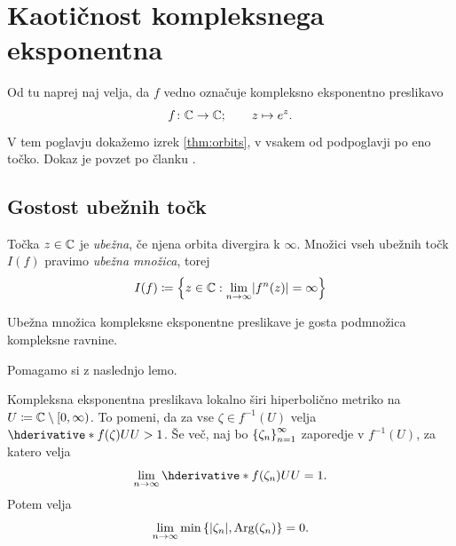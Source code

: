 \section{Kaotičnost kompleksnega eksponentna}

Od tu naprej naj velja, da \(f\) vedno označuje kompleksno eksponentno preslikavo
\[f \colon \mathbb C \to \mathbb C; \qquad z \mapsto e^{z}.\]
V tem poglavju dokažemo izrek \ref{thm:orbits}, v vsakem od podpoglavji po eno točko. Dokaz je povzet po članku \cite{Shen_2015}.

\subsection{Gostost ubežnih točk}

Točka \(z \in \mathbb C\) je \emph{ubežna}, če njena orbita divergira k \(\infty\). Množici vseh ubežnih točk \(I (f)\) pravimo \emph{ubežna množica}, torej
\[I (f) \coloneq \set{z \in \CC : \lim_{n \to \infty} \abs{f^n (z)} = \infty}\]

\begin{izrek} \label{thm:escapingdense}
    Ubežna množica kompleksne eksponentne preslikave je gosta podmnožica kompleksne ravnine.
\end{izrek}

\noindent Pomagamo si z naslednjo lemo.

\begin{lema} \label{lem:hyper}
    Kompleksna eksponentna preslikava lokalno širi hiperbolično metriko na \(U \coloneq \mathbb C \setminus [0, \infty)\). To pomeni, da za vse \(\zeta \in f^{-1} (U)\) velja \(\hder{f (\zeta)}{U}{U} > 1\). Še več, naj bo \(\left\{ \zeta_n \right\}_{n = 1}^{\infty}\) zaporedje v \(f^{-1} (U)\), za katero velja \[\lim_{n \to \infty} \hder{f (\zeta_n)}{U}{U} = 1.\] Potem velja
    \[\lim_{n \to \infty} \min \left\{ |\zeta_n|, \operatorname{Arg} (\zeta_n) \right\} = 0.\]
\end{lema}

